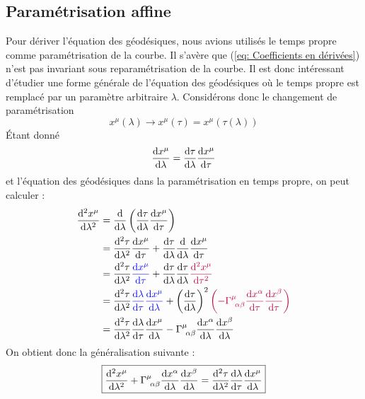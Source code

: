 \subsection{Paramétrisation affine}
Pour dériver l'équation des géodésiques, nous avions utilisés le temps propre comme paramétrisation de la courbe. Il s'avère que (\ref{eq: Coefficients en dérivées}) n'est pas invariant sous reparamétrisation de la courbe. Il est donc intéressant d'étudier une forme générale de l'équation des géodésiques où le temps propre est remplacé par un paramètre arbitraire $\lambda$. Considérons donc le changement de paramétrisation
\begin{equation*}
    x^\mu (\lambda) \to x^\mu(\tau) = x^\mu(\tau(\lambda))
\end{equation*}
Étant donné
\begin{equation}
    \frac{\mathrm{d} x^{\mu}}{\mathrm{d} \lambda} = \frac{\mathrm{d} \tau}{\mathrm{d} \lambda}\frac{\mathrm{d}  x^{\mu}}{\mathrm{d} \tau}
\end{equation}
et l'équation des géodésiques dans la paramétrisation en temps propre, on peut calculer :
\begin{align}
    \frac{\td ^2 x^{\mu}}{\td \lambda ^2} &= \frac{\td }{\td \lambda}\left(\frac{\td \tau}{\td \lambda}\frac{\td  x^{\mu}}{\td \tau}\right)\\
    & = \frac{\td ^2 \tau}{\td \lambda ^2}\frac{\td  x^{\mu}}{\td \tau} +  \frac{\td \tau}{\td \lambda} \frac{\td }{\td \lambda}\frac{\td  x^{\mu}}{\td \tau }\\
    &=\frac{\td ^2 \tau}{\td \lambda ^2}\textcolor{blue}{\frac{\td  x^{\mu}}{\td \tau}} +  \frac{\td \tau}{\td \lambda} \frac{\td \tau}{\td \lambda}\textcolor{purple}{\frac{\td ^2 x^{\mu}}{\td \tau ^2}}\\
    &= \frac{\td ^2 \tau}{\td \lambda ^2}\textcolor{blue}{\frac{\td \lambda}{\td \tau}\frac{\td  x^{\mu}}{\td \lambda}} + \left(\frac{\td \tau}{\td \lambda}\right)^2\textcolor{purple}{\lt-\Gamma\indices{^{\mu}_{\!\alpha \beta}}\frac{\td  x^{\alpha}}{\td \tau}\frac{\td  x^{\beta}}{\td \tau} \rt}\\
    &= \frac{\td ^2 \tau}{\td \lambda ^2}\frac{\td \lambda}{\td \tau}\frac{\td  x^{\mu}}{\td \lambda} - \Gamma\indices{^{\mu}_{\!\alpha \beta}}\frac{\td  x^{\alpha}}{\td \lambda}\frac{\td  x^{\beta}}{\td \lambda}
\end{align}
On obtient donc la généralisation suivante :
\begin{align}
     \boxed{\frac{\td ^2 x^{\mu}}{\td \lambda ^2} + \Gamma\indices{^{\mu}_{\!\alpha \beta}}\frac{\td  x^{\alpha}}{\td \lambda}\frac{\td  x^{\beta}}{\td \lambda} = \frac{\td ^2 \tau}{\td \lambda ^2}\frac{\td \lambda}{\td \tau}\frac{\td  x^{\mu}}{\td \lambda}}
     \label{eq:pour expliquer Morera v2}
\end{align}
